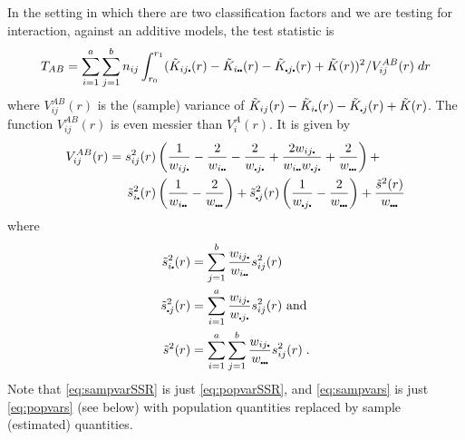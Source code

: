 \documentclass[12pt]{article}
\newcommand{\pt}{\mbox{\scalebox{0.4}{$\bullet$}}}
\newcommand{\tils}{\mbox{$\tilde{s}$}}
\begin{document}
In the setting in which there are two classification factors and we are
testing for interaction, against an additive models, the test statistic is
\[
T_{AB} = \sum_{i=1}^a \sum_{j=1}^b n_{ij} \int_{r_0}^{r_1} (\tilde{K}_{ij \pt}(r) -
   \tilde{K}_{i \pt \pt}(r) - \tilde{K}_{\pt j \pt}(r) +
   \tilde{K}(r))^2/V^{AB}_{ij}(r) \; dr
\]
where $V^{AB}_{ij}(r)$ is the (sample) variance of $\tilde{K}_{ij}(r)
- \tilde{K}_{i\pt}(r) - \tilde{K}_{\pt j}(r) + \tilde{K}(r)$.
The function $V^{AB}_{ij}(r)$ is even messier than $V^A_i(r)$.
It is given by
\begin{equation}
\label{eq:sampvarSSR}
\begin{split}
V^{AB}_{ij}(r) = s_{ij}^2(r) &\left ( \frac{1}{w_{i j \pt}} -
                                      \frac{2}{w_{i \pt \pt}} -
                                      \frac{2}{w_{\pt j \pt}} +
                                      \frac{2w_{ij \pt}}{w_{i \pt \pt} w_{\pt j \pt}} +
                                      \frac{2}{w_{\pt \pt \pt}} \right )+ \\
               \tils^2_{i \pt}(r) &\left ( \frac{1}{w_{i \pt \pt}} -
                                   \frac{2}{w_{\pt \pt \pt}} \right )+
               \tils^2_{\pt j}(r) \left (\frac{1}{w_{\pt j \pt}} -
                                   \frac{2}{w_{\pt \pt \pt}} \right )+
                            \frac{\tilde{s}^2(r)}{w_{\pt \pt \pt}}
\end{split}
\end{equation}
where
\begin{equation}
\label{eq:sampvars}
\begin{split}
\tils_{i \pt}^2(r) &= \sum_{j=1}^b \frac{w_{ij \pt}}{w_{i \pt \pt}} s^2_{ij}(r) \\
\tils_{\pt j}^2(r) &= \sum_{i=1}^a \frac{w_{ij \pt}}{w_{\pt j \pt}} s^2_{ij}(r)
                        \mbox{~and}\\
\tils^2(r) &= \sum_{i=1}^a \sum_{j=1}^b \frac{w_{i j \pt}}{w_{\pt \pt \pt}}
                                          s^2_{ij}(r) \; .
\end{split}
\end{equation}
Note that \eqref{eq:sampvarSSR} is just \eqref{eq:popvarSSR},
and \eqref{eq:sampvars} is just \eqref{eq:popvars} (see below)
with population quantities replaced by sample (estimated) quantities.
\end{document}
